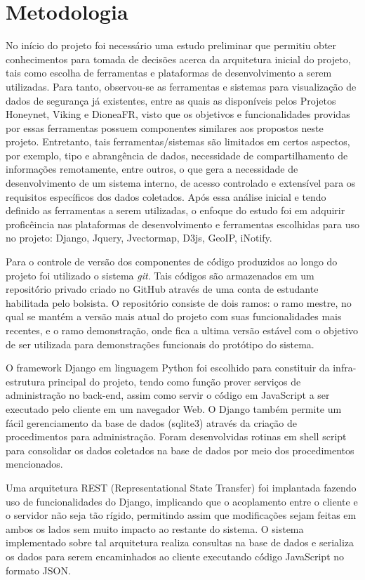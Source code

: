 \documentclass[%
        Portuguese,%
        ]
{ic-tese-v2}
\begin{document}
\chapter{Metodologia}
No início do projeto foi necessário uma estudo preliminar que permitiu obter conhecimentos para tomada de decisões acerca da arquitetura inicial do projeto, tais como escolha de ferramentas e plataformas de desenvolvimento a serem utilizadas.
Para tanto, observou-se as ferramentas e sistemas para visualização de dados de segurança já existentes, entre as quais as disponíveis pelos Projetos Honeynet, Viking e DioneaFR, visto que os objetivos e funcionalidades providas por essas ferramentas possuem componentes similares aos propostos neste projeto. Entretanto, tais ferramentas/sistemas são limitados em certos aspectos, por exemplo, tipo e abrangência de dados, necessidade de compartilhamento de informações remotamente, entre outros, o que gera a necessidade de desenvolvimento de um sistema interno, de acesso controlado e extensível para os requisitos específicos dos dados coletados.
Após essa análise inicial e tendo definido as ferramentas a serem utilizadas, o enfoque do estudo foi em adquirir proficêincia nas plataformas de desenvolvimento e ferramentas escolhidas para uso no projeto: Django, Jquery, Jvectormap, D3js, GeoIP, iNotify.

Para o controle de versão dos componentes de có́digo produzidos ao longo do projeto foi utilizado o sistema \emph{git}. Tais có́digos são armazenados em um repositó́rio privado criado no GitHub através de uma conta de estudante habilitada pelo bolsista. O repositó́rio consiste de dois ramos: o ramo mestre, no qual se mantém a versão mais atual do projeto com suas funcionalidades mais recentes, e o ramo demonstração, onde fica a ultima versão estável com o objetivo de ser utilizada para demonstrações funcionais do protótipo do sistema.

O framework Django em linguagem Python foi escolhido para constituir da infra-estrutura principal do projeto, tendo como função prover serviços de administração no back-end, assim como servir o có́digo em JavaScript a ser executado pelo cliente em um navegador Web. O Django também permite um fácil gerenciamento da base de dados (sqlite3) através da criação de procedimentos para administração. Foram desenvolvidas rotinas em shell script para consolidar os dados coletados na base de dados por meio dos procedimentos mencionados.

Uma arquitetura REST (Representational State Transfer) foi implantada fazendo uso de funcionalidades do Django, implicando que o acoplamento entre o cliente e o servidor não seja tão rígido, permitindo assim que modificações sejam feitas em ambos os lados sem muito impacto ao restante do sistema. O sistema implementado sobre tal arquitetura realiza consultas na base de dados e serializa os dados para serem encaminhados ao cliente executando có́digo JavaScript no formato JSON.
\end{document}
